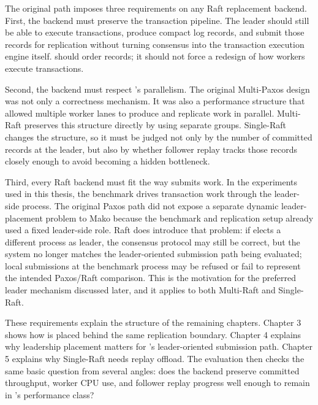 The original \Mako{} path imposes three requirements on any Raft replacement
backend. First, the backend must preserve the transaction pipeline.
The leader should still be able to execute transactions, produce compact log
records, and submit those records for replication without turning consensus
into the transaction execution engine itself. \Raft{} should order records; it
should not force a redesign of how \Mako{} workers execute transactions.

Second, the backend must respect \Mako{}'s parallelism. The original
Multi-Paxos design was not only a correctness mechanism. It was also a
performance structure that allowed multiple worker lanes to produce and
replicate work in parallel. Multi-Raft preserves this structure directly by
using separate \Raft{} groups. Single-Raft changes the structure, so it must be
judged not only by the number of committed records at the leader, but also by
whether follower replay tracks those records closely enough to avoid becoming a
hidden bottleneck.

Third, every Raft backend must fit the way \Mako{} submits work. In the
experiments used in this thesis, the benchmark drives transaction work through
the leader-side process. The original Paxos path did not expose a separate
dynamic leader-placement problem to Mako because the benchmark and replication
setup already used a fixed leader-side role. Raft does introduce that problem:
if \Raft{} elects a different process as leader, the consensus protocol may
still be correct, but the system no longer matches the leader-oriented
submission path being evaluated; local submissions at the benchmark process may
be refused or fail to represent the intended Paxos/Raft comparison. This is
the motivation for the preferred leader mechanism discussed later, and it
applies to both Multi-Raft and Single-Raft.

These requirements explain the structure of the remaining chapters. Chapter 3
shows how \Raft{} is placed behind the same replication boundary. Chapter 4
explains why leadership placement matters for \Mako{}'s leader-oriented
submission path. Chapter 5 explains why Single-Raft needs replay offload. The
evaluation then checks the same basic question from several angles: does the
\Raft{} backend preserve committed throughput, worker CPU use, and follower
replay progress well enough to remain in \Paxos{}'s performance class?
